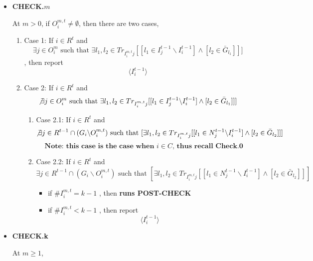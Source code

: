 \documentclass[12pt,letter]{article}
\theoremstyle{definition}
\theoremstyle{remark}
\theoremstyle{claim}
\begin{document}
\begin{itemize}
\begin{enumerate}
\begin{itemize}
\end{itemize}
\end{enumerate}




\item \textbf{CHECK.$m$}

 At $m>0$, if $O^{m,t}_i\neq \emptyset$, then there are two cases, 
\begin{enumerate}
\item Case 1: If $i\in R^t$ and 
\[\exists j\in  O^m_i \text{ such that }\exists l_1,l_2\in Tr_{I^{m,t}_ij}[[l_1\in I^{t-1}_j\backslash I^{t-1}_i] \wedge [l_2\in \bar{G}_{l_1}]]]\]
, then report 
\[\langle I^{t-1}_i \rangle\]
\item Case 2: If $i\in R^t$ and 
\[\not\exists j\in  O^m_i \text{ such that }\exists l_1,l_2\in Tr_{I^{m,t}_ij}[[l_1\in I^{t-1}_j\backslash I^{t-1}_i] \wedge [l_2\in \bar{G}_{l_1}]]]\]

\begin{enumerate}
\item Case 2.1: If $i\in R^t$ and 
\[\not\exists j\in R^{t-1}\cap (G_i\backslash  O^{m,t}_i) \text{ such that }[\exists l_1,l_2\in Tr_{I^{m,t}_ij}[[l_1\in N^{t-1}_j\backslash I^{t-1}_i] \wedge [l_2\in \bar{G}_{l_2}]]]\]
\[\textbf{Note: this case is the case when $i\in C$, thus recall Check.0}\]

\item Case 2.2: If $i\in R^t$ and 
\[\exists j\in R^{t-1}\cap (G_i\backslash  O^{m,t}_i) \text{ such that }[\exists l_1,l_2\in Tr_{I^{m,t}_ij}[[l_1\in N^{t-1}_j\backslash I^{t-1}_i] \wedge [l_2\in \bar{G}_{l_2}]]]\]

\begin{itemize}
\item if $\# I^{m,t}_i= k-1$
, then 
\textbf{runs POST-CHECK }

\item if $\# I^{m,t}_i< k-1$
, then report 
\[\langle I^{t-1}_i \rangle\]
\end{itemize}





\end{enumerate}

\end{enumerate}





\item \textbf{CHECK.k}

At $m\geq 1$, 
\begin{enumerate}



\end{enumerate}
\end{itemize}
\end{document}
